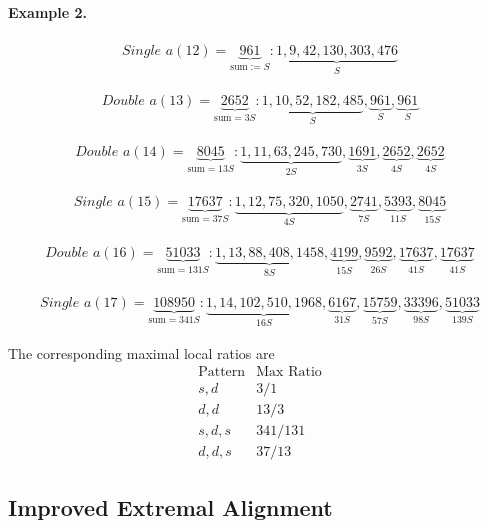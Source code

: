 \documentclass[12pt, oneside]{article}   	%
\numberwithin{equation}{section}          %
\theoremstyle{definition}
\begin{document}
\paragraph{Example 2.}
\[
\begin{array}{l}
\textit{Single } a(12) = \underbrace{961}_{\text{sum} := S}:
\underbrace{1,9,42,130,303,476}_{S}
\end{array}
\]

\[
\begin{array}{l}
\textit{Double } a(13) = \underbrace{2652}_{\text{sum} = 3S}:
\underbrace{1,10,52,182,485}_{S},
\underbrace{961}_{S},
\underbrace{961}_{S}
\end{array}
\]

\[
\begin{array}{l}
\textit{Double } a(14) = \underbrace{8045}_{\text{sum} = 13S}:
\underbrace{1,11,63,245,730}_{2S},
\underbrace{1691}_{3S},
\underbrace{2652}_{4S},
\underbrace{2652}_{4S}
\end{array}
\]

\[
\begin{array}{l}
\textit{Single } a(15) = \underbrace{17637}_{\text{sum} = 37S}:
\underbrace{1,12,75,320,1050}_{4S},
\underbrace{2741}_{7S},
\underbrace{5393}_{11S},
\underbrace{8045}_{15S}
\end{array}
\]

\[
\begin{array}{l}
\textit{Double } a(16) = \underbrace{51033}_{\text{sum} = 131S}:
\underbrace{1,13,88,408,1458}_{8S},
\underbrace{4199}_{15S},
\underbrace{9592}_{26S},
\underbrace{17637}_{41S},
\underbrace{17637}_{41S}
\end{array}
\]

\[
\begin{array}{l}
\textit{Single } a(17) = \underbrace{108950}_{\text{sum} = 341S}:
\underbrace{1,14,102,510,1968}_{16S},
\underbrace{6167}_{31S},
\underbrace{15759}_{57S},
\underbrace{33396}_{98S},
\underbrace{51033}_{139S}
\end{array}
\]

The corresponding maximal local ratios are
\[
\begin{array}{c|c}
\text{Pattern} & \text{Max Ratio} \\
\hline
s,d & 3/1 \\
d,d & 13/3 \\
s,d,s & 341/131 \\
d,d,s & 37/13
\end{array}
\]

\subsection*{Improved Extremal Alignment}
\end{document}
